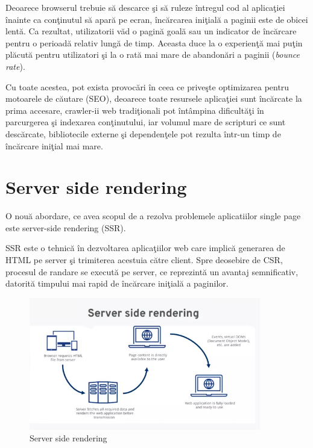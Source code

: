 \documentclass[12pt, a4paper]{report}
\begin{document}

Deoarece browserul trebuie s\u a descarce \c si s\u a ruleze \^intregul cod al aplica\c tiei \^inainte ca con\c tinutul s\u a apar\u a pe ecran, \^inc\u arcarea ini\c tial\u a a paginii este de obicei lent\u a. Ca rezultat, utilizatorii v\u ad o pagin\u a goal\u a sau un indicator de \^inc\u arcare pentru o perioad\u a relativ lung\u a de timp. Aceasta duce la o experien\c t\u a mai pu\c tin pl\u acut\u a pentru utilizatori \c si la o rat\u a mai mare de abandon\u ari a paginii (\textit{bounce rate}). \cite{google-bouncing-rate}

Cu toate acestea, pot exista provoc\u ari \^in ceea ce prive\c ste optimizarea pentru motoarele de c\u autare (SEO), deoarece toate resursele aplica\c tiei sunt \^inc\u arcate la prima accesare, crawler-ii web tradi\c tionali pot \^int\^ampina dificult\u a\c ti \^in parcurgerea \c si indexarea con\c tinutului, iar volumul mare de scripturi ce sunt desc\u arcate, bibliotecile externe \c si dependen\c tele pot rezulta \^intr-un timp de \^inc\u arcare ini\c tial mai mare.

\section{Server side rendering}

O nou\u a abordare, ce avea scopul de a rezolva problemele aplicatiilor single page este server-side rendering (SSR).

SSR este o tehnic\u a \^in dezvoltarea aplica\c tiilor web care implic\u a generarea de HTML pe server \c si trimiterea acestuia c\u atre client. Spre deosebire de CSR, procesul de randare se execut\u a pe server, ce reprezint\u a un avantaj semnificativ, datorit\u a timpului mai rapid de \^inc\u arcare ini\c tial\u a a paginilor. \cite{benefitsserverrendering}

\begin{figure}[htbp]
	\centering
	\includegraphics[width=0.9\textwidth]{ssr-diagram.png}
	\caption{Server side rendering \protect\footnotemark}
	\label{fig:ssr-diagram}
\end{figure}
\end{document}
